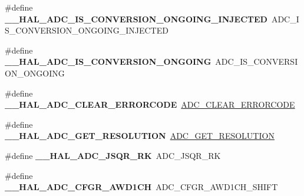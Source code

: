 \begin{DoxyCompactItemize}
\item 
\mbox{\label{group___h_a_l___a_d_c___aliased___macros_ga085a3824fd83a50c46bcc8edaf0f986d}} 
\#define {\bfseries \+\_\+\+\_\+\+H\+A\+L\+\_\+\+A\+D\+C\+\_\+\+I\+S\+\_\+\+C\+O\+N\+V\+E\+R\+S\+I\+O\+N\+\_\+\+O\+N\+G\+O\+I\+N\+G\+\_\+\+I\+N\+J\+E\+C\+T\+ED}~A\+D\+C\+\_\+\+I\+S\+\_\+\+C\+O\+N\+V\+E\+R\+S\+I\+O\+N\+\_\+\+O\+N\+G\+O\+I\+N\+G\+\_\+\+I\+N\+J\+E\+C\+T\+ED
\item 
\mbox{\label{group___h_a_l___a_d_c___aliased___macros_ga64acf0d02a8ef5df5644c4232cef1fca}} 
\#define {\bfseries \+\_\+\+\_\+\+H\+A\+L\+\_\+\+A\+D\+C\+\_\+\+I\+S\+\_\+\+C\+O\+N\+V\+E\+R\+S\+I\+O\+N\+\_\+\+O\+N\+G\+O\+I\+NG}~A\+D\+C\+\_\+\+I\+S\+\_\+\+C\+O\+N\+V\+E\+R\+S\+I\+O\+N\+\_\+\+O\+N\+G\+O\+I\+NG
\item 
\mbox{\label{group___h_a_l___a_d_c___aliased___macros_ga18c93f7ab9df4bb73371bbe50a131d6d}} 
\#define {\bfseries \+\_\+\+\_\+\+H\+A\+L\+\_\+\+A\+D\+C\+\_\+\+C\+L\+E\+A\+R\+\_\+\+E\+R\+R\+O\+R\+C\+O\+DE}~\mbox{\hyperlink{group___a_d_c___private___macros_gac7ab87a3ab932eed1b3ac5faad4e3aa9}{A\+D\+C\+\_\+\+C\+L\+E\+A\+R\+\_\+\+E\+R\+R\+O\+R\+C\+O\+DE}}
\item 
\mbox{\label{group___h_a_l___a_d_c___aliased___macros_gaadc60b61ddd4d5572f3a4c6dbc0520a6}} 
\#define {\bfseries \+\_\+\+\_\+\+H\+A\+L\+\_\+\+A\+D\+C\+\_\+\+G\+E\+T\+\_\+\+R\+E\+S\+O\+L\+U\+T\+I\+ON}~\mbox{\hyperlink{group___a_d_c___private___macros_gae2da95074db4dd0418c1dd1f13ad7970}{A\+D\+C\+\_\+\+G\+E\+T\+\_\+\+R\+E\+S\+O\+L\+U\+T\+I\+ON}}
\item 
\mbox{\label{group___h_a_l___a_d_c___aliased___macros_ga3f3d0f19ef64dab8816b7e4d563da42c}} 
\#define {\bfseries \+\_\+\+\_\+\+H\+A\+L\+\_\+\+A\+D\+C\+\_\+\+J\+S\+Q\+R\+\_\+\+RK}~A\+D\+C\+\_\+\+J\+S\+Q\+R\+\_\+\+RK
\item 
\mbox{\label{group___h_a_l___a_d_c___aliased___macros_gaf2b93300d6c91bbe5a0253368ade466f}} 
\#define {\bfseries \+\_\+\+\_\+\+H\+A\+L\+\_\+\+A\+D\+C\+\_\+\+C\+F\+G\+R\+\_\+\+A\+W\+D1\+CH}~A\+D\+C\+\_\+\+C\+F\+G\+R\+\_\+\+A\+W\+D1\+C\+H\+\_\+\+S\+H\+I\+FT

\end{DoxyCompactItemize}
